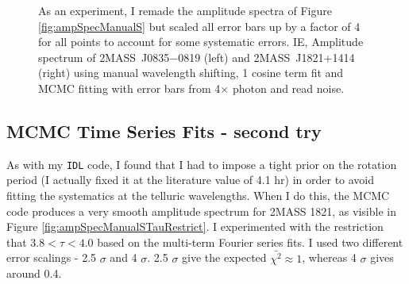 \documentclass[manuscript]{aastex6}
\newcommand{\sha}{2MASS~J0835$-$0819}
\newcommand{\shb}{2MASS~J1821+1414}
\begin{document}
\begin{figure}[!t]
\centering
{}
	\caption{As an experiment, I remade the amplitude spectra of Figure \ref{fig:ampSpecManualS} but scaled all error bars up by a factor of 4 for all points to account for some systematic errors. IE, Amplitude spectrum of {\sha} (left)  and {\shb} (right) using manual wavelength shifting, 1 cosine term fit and MCMC fitting with error bars from 4$\times$ photon and read noise.}
	\label{fig:ampSpecManualSfourTimesErr}
	\vspace{0.1in}
\end{figure} 

\clearpage
\pagebreak
\subsection{MCMC Time Series Fits - second try}

As with my \texttt{IDL} code, I found that I had to impose a tight prior on the rotation period (I actually fixed it at the literature value of 4.1 hr) in order to avoid fitting the systematics at the telluric wavelengths.
When I do this, the MCMC code produces a very smooth amplitude spectrum for 2MASS 1821, as visible in Figure \ref{fig:ampSpecManualSTauRestrict}.
I experimented with the restriction that $3.8 < \tau < 4.0$ based on the multi-term Fourier series fits.
I used two different error scalings - 2.5 $\sigma$ and 4 $\sigma$.
2.5 $\sigma$ give the expected $\bar{\chi^2} \approx 1$, whereas 4 $\sigma$ gives around 0.4.
\end{document}
